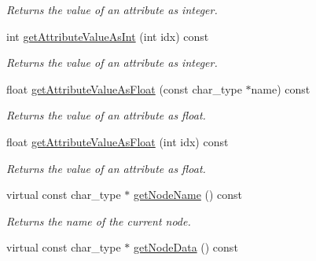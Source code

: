 \begin{DoxyCompactItemize}
\begin{DoxyCompactList}\small\item\em Returns the value of an attribute as integer. \end{DoxyCompactList}\item 
\hypertarget{classirr_1_1io_1_1_c_x_m_l_reader_impl_a8c8cf8e6560299e3315cd1a75477bd53}{int \hyperlink{classirr_1_1io_1_1_c_x_m_l_reader_impl_a8c8cf8e6560299e3315cd1a75477bd53}{get\-Attribute\-Value\-As\-Int} (int idx) const }\label{classirr_1_1io_1_1_c_x_m_l_reader_impl_a8c8cf8e6560299e3315cd1a75477bd53}

\begin{DoxyCompactList}\small\item\em Returns the value of an attribute as integer. \end{DoxyCompactList}\item 
\hypertarget{classirr_1_1io_1_1_c_x_m_l_reader_impl_a89fb9f69bba65c76e23d6519bcb5df7d}{float \hyperlink{classirr_1_1io_1_1_c_x_m_l_reader_impl_a89fb9f69bba65c76e23d6519bcb5df7d}{get\-Attribute\-Value\-As\-Float} (const char\-\_\-type $\ast$name) const }\label{classirr_1_1io_1_1_c_x_m_l_reader_impl_a89fb9f69bba65c76e23d6519bcb5df7d}

\begin{DoxyCompactList}\small\item\em Returns the value of an attribute as float. \end{DoxyCompactList}\item 
\hypertarget{classirr_1_1io_1_1_c_x_m_l_reader_impl_a14d3f55dd2260b970525336713b8270e}{float \hyperlink{classirr_1_1io_1_1_c_x_m_l_reader_impl_a14d3f55dd2260b970525336713b8270e}{get\-Attribute\-Value\-As\-Float} (int idx) const }\label{classirr_1_1io_1_1_c_x_m_l_reader_impl_a14d3f55dd2260b970525336713b8270e}

\begin{DoxyCompactList}\small\item\em Returns the value of an attribute as float. \end{DoxyCompactList}\item 
\hypertarget{classirr_1_1io_1_1_c_x_m_l_reader_impl_a30ddc03ee634ed0dbeef25547677f2da}{virtual const char\-\_\-type $\ast$ \hyperlink{classirr_1_1io_1_1_c_x_m_l_reader_impl_a30ddc03ee634ed0dbeef25547677f2da}{get\-Node\-Name} () const }\label{classirr_1_1io_1_1_c_x_m_l_reader_impl_a30ddc03ee634ed0dbeef25547677f2da}

\begin{DoxyCompactList}\small\item\em Returns the name of the current node. \end{DoxyCompactList}\item 
\hypertarget{classirr_1_1io_1_1_c_x_m_l_reader_impl_ac661ef32418a004c1ec3b6e02c9615df}{virtual const char\-\_\-type $\ast$ \hyperlink{classirr_1_1io_1_1_c_x_m_l_reader_impl_ac661ef32418a004c1ec3b6e02c9615df}{get\-Node\-Data} () const }\label{classirr_1_1io_1_1_c_x_m_l_reader_impl_ac661ef32418a004c1ec3b6e02c9615df}


\end{DoxyCompactItemize}
